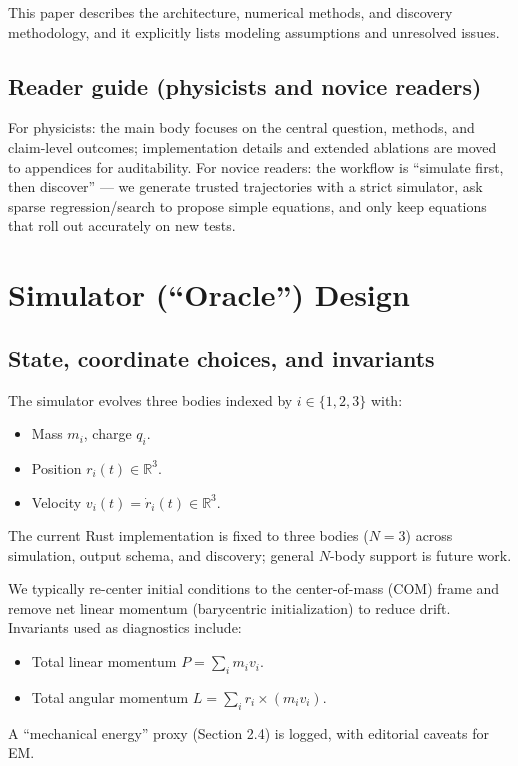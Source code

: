 \documentclass[11pt]{article}
\begin{document}
This paper describes the architecture, numerical methods, and discovery methodology, and it explicitly lists modeling assumptions and unresolved issues.

\subsection*{Reader guide (physicists and novice readers)}
For physicists: the main body focuses on the central question, methods, and claim-level outcomes; implementation details and extended ablations are moved to appendices for auditability.
For novice readers: the workflow is ``simulate first, then discover'' --- we generate trusted trajectories with a strict simulator, ask sparse regression/search to propose simple equations, and only keep equations that roll out accurately on new tests.

\section{Simulator (``Oracle'') Design}
\subsection{State, coordinate choices, and invariants}
The simulator evolves three bodies indexed by $i \in \{1,2,3\}$ with:
\begin{itemize}
\item Mass $m_i$, charge $q_i$.
\item Position $r_i(t) \in \mathbb{R}^3$.
\item Velocity $v_i(t) = \dot{r}_i(t) \in \mathbb{R}^3$.
\end{itemize}
The current Rust implementation is fixed to three bodies ($N=3$) across simulation, output schema, and discovery; general $N$-body support is future work.

We typically re-center initial conditions to the center-of-mass (COM) frame and remove net linear momentum (barycentric initialization) to reduce drift. Invariants used as diagnostics include:
\begin{itemize}
\item Total linear momentum $P = \sum_i m_i v_i$.
\item Total angular momentum $L = \sum_i r_i \times (m_i v_i)$.
\end{itemize}

A ``mechanical energy'' proxy (Section 2.4) is logged, with editorial caveats for EM.
\end{document}
